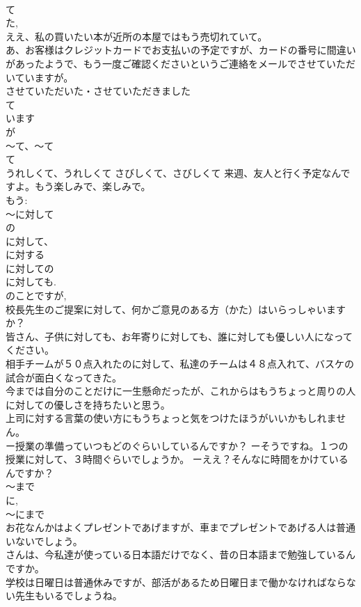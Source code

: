 \documentclass[8pt]{extreport}
\begin{document}
\begin{CJK}{UTF8}{min}
\\	て 
\\	た, 
\\	ええ、私の買いたい本が近所の本屋ではもう売切れていて。 
\\	あ、お客様はクレジットカードでお支払いの予定ですが、カードの番号に間違いがあったようで、もう一度ご確認くださいというご連絡をメールでさせていただいていますが。 
\\	させていただいた・させていただきました 
\\	て 
\\	います 
\\	が 
\\	～て、～て	
\\	て 
\\	うれしくて、うれしくて さびしくて、さびしくて 来週、友人と行く予定なんですよ。もう楽しみで、楽しみで。 
\\	もう: 
\\	～に対して	
\\	の 
\\	に対して、
\\	に対する
\\	に対しての
\\	に対しても. 
\\	のことですが, 
\\	校長先生のご提案に対して、何かご意見のある方（かた）はいらっしゃいますか？ 
\\	皆さん、子供に対しても、お年寄りに対しても、誰に対しても優しい人になってください。 
\\	相手チームが５０点入れたのに対して、私達のチームは４８点入れて、バスケの試合が面白くなってきた。 
\\	今までは自分のことだけに一生懸命だったが、これからはもうちょっと周りの人に対しての優しさを持ちたいと思う。 
\\	上司に対する言葉の使い方にもうちょっと気をつけたほうがいいかもしれません。 
\\	ー授業の準備っていつもどのぐらいしているんですか？ ーそうですね。１つの授業に対して、３時間ぐらいでしょうか。 ーええ？そんなに時間をかけているんですか？
\\	～まで
\\	に, 
\\	～にまで
\\	お花なんかはよくプレゼントであげますが、車までプレゼントであげる人は普通いないでしょう。 
\\	さんは、今私達が使っている日本語だけでなく、昔の日本語まで勉強しているんですか。 
\\	学校は日曜日は普通休みですが、部活があるため日曜日まで働かなければならない先生もいるでしょうね。 

\end{CJK}
\end{document}
